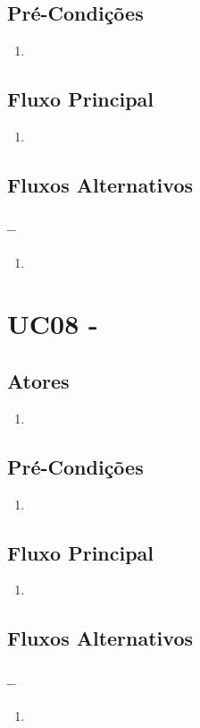 \subsection{Pré-Condições}
\begin{enumerate}
  \item
\end{enumerate}

\subsection{Fluxo Principal}
\begin{enumerate}
  \item
\end{enumerate}

\subsection{Fluxos Alternativos}

\subsubsection{--}

\begin{enumerate}
  \item
\end{enumerate}

\section{UC08 -}


\subsection{Atores}

\begin{enumerate}
  \item
\end{enumerate}

\subsection{Pré-Condições}
\begin{enumerate}
  \item
\end{enumerate}

\subsection{Fluxo Principal}
\begin{enumerate}
  \item
\end{enumerate}

\subsection{Fluxos Alternativos}

\subsubsection{--}

\begin{enumerate}
  \item
\end{enumerate}

